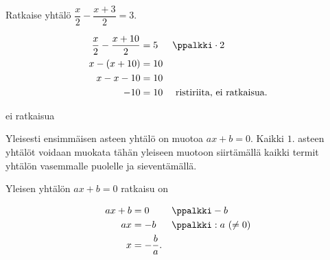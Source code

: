 \begin{esimerkki}
Ratkaise yhtälö $\dfrac{x}{2}-\dfrac{x+3}{2}=3$.
	\begin{esimratk}
  \begin{align*}
    \frac{x}{2}-\frac{x+10}{2}&=5 && \ppalkki \cdot 2 \\
        x-(x+10) &= 10  \\
         x-x-10 &= 10 \\
         -10 &= 10 && \text{ ristiriita, ei ratkaisua.}
  \end{align*}
	\end{esimratk}
	\begin{esimvast}
ei ratkaisua
	\end{esimvast}
\end{esimerkki}

Yleisesti ensimmäisen asteen yhtälö on muotoa $ax + b = 0$. Kaikki $1$. asteen yhtälöt voidaan muokata tähän yleiseen muotoon siirtämällä kaikki termit yhtälön vasemmalle puolelle ja sieventämällä.

Yleisen yhtälön $ax + b = 0$ ratkaisu on

\begin{align*}
	 ax + b &= 0  && \ppalkki -b\\
	 ax &= -b  && \ppalkki : a \ (\neq 0)\\
  x &= -\frac{b}{a}.
\end{align*}

